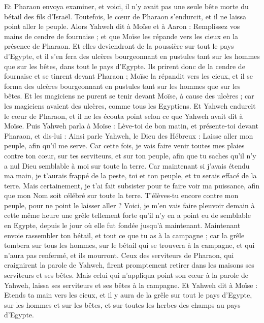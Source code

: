 \begin{multicols}{2}
Et Pharaon envoya examiner, et voici, il n'y avait pas une seule bête morte du bétail des fils d'Israël. Toutefois, le cœur de Pharaon s'endurcit, et il ne laissa point aller le peuple.
Alors Yahweh dit à Moïse et à Aaron : Remplissez vos mains de cendre de fournaise ; et que Moïse les répande vers les cieux en la présence de Pharaon.
Et elles deviendront de la poussière sur tout le pays d'Egypte, et il s'en fera des ulcères bourgeonnant en pustules tant sur les hommes que sur les bêtes, dans tout le pays d'Egypte.
Ils prirent donc de la cendre de fournaise et se tinrent devant Pharaon ; Moïse la répandit vers les cieux, et il se forma des ulcères bourgeonnant en pustules tant sur les hommes que sur les bêtes.
 Et les magiciens ne purent se tenir devant Moïse, à cause des ulcères ; car les magiciens avaient des ulcères, comme tous les Egyptiens.
 Et Yahweh endurcit le cœur de Pharaon, et il ne les écouta point selon ce que Yahweh avait dit à Moïse.
Puis Yahweh parla à Moïse : Lève-toi de bon matin, et présente-toi devant Pharaon, et dis-lui : Ainsi parle Yahweh, le Dieu des Hébreux : Laisse aller mon peuple, afin qu'il me serve.
Car cette fois, je vais faire venir toutes mes plaies contre ton cœur, sur tes serviteurs, et sur ton peuple, afin que tu saches qu'il n'y a nul Dieu semblable à moi sur toute la terre.
Car maintenant si j'avais étendu ma main, je t'aurais frappé de la peste, toi et ton peuple, et tu serais effacé de la terre.
Mais certainement, je t'ai fait subsister pour te faire voir ma puissance, afin que mon Nom soit célébré sur toute la terre.
T'élèves-tu encore contre mon peuple, pour ne point le laisser aller ?
Voici, je m'en vais faire pleuvoir demain à cette même heure une grêle tellement forte qu’il n'y en a point eu de semblable en Egypte, depuis le jour où elle fut fondée jusqu’à maintenant.
Maintenant envoie rassembler ton bétail, et tout ce que tu as à la campagne ; car la grêle tombera sur tous les hommes, sur le bétail qui se trouvera à la campagne, et qui n’aura pas renfermé, et ils mourront.
Ceux des serviteurs de Pharaon, qui craignirent la parole de Yahweh, firent promptement retirer dans les maisons ses serviteurs et ses bêtes.
Mais celui qui n'appliqua point son cœur à la parole de Yahweh, laissa ses serviteurs et ses bêtes à la campagne.
Et Yahweh dit à Moïse : Etends ta main vers les cieux, et il y aura de la grêle sur tout le pays d'Egypte, sur les hommes et sur les bêtes, et sur toutes les herbes des champs au pays d'Egypte.

\end{multicols}
